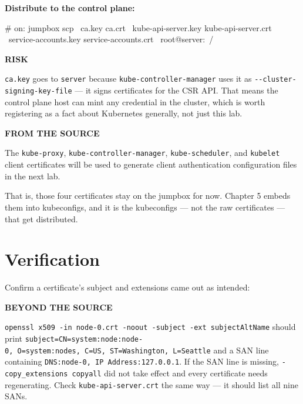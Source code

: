 \documentclass[11pt,oneside]{report}
\newcommand{\calloutlabel}[2]{{\sffamily\bfseries\footnotesize\color{#1}#2\quad}}
\begin{document}
\textbf{Distribute
to the control
plane:}

\begin{cmdlst}
# on: jumpbox
scp \
  ca.key ca.crt \
  kube-api-server.key kube-api-server.crt \
  service-accounts.key service-accounts.crt \
  root@server:~/
\end{cmdlst}

\begin{riskbox}\calloutlabel{brick}{RISK}

\texttt{ca.key} goes
to \texttt{server}
because
\texttt{kube-}\allowbreak{}\texttt{controller-}\allowbreak{}\texttt{manager}
uses it as
\texttt{-\/-cluster-}\allowbreak{}\texttt{signing-}\allowbreak{}\texttt{key-}\allowbreak{}\texttt{file}
--- it signs
certificates for the
CSR API. That means
the control plane
host can mint any
credential in the
cluster, which is
worth registering as
a fact about
Kubernetes
generally, not just
this lab.

\end{riskbox}

\begin{notebox}\calloutlabel{steel}{FROM THE SOURCE}

The
\texttt{kube-proxy},
\texttt{kube-}\allowbreak{}\texttt{controller-}\allowbreak{}\texttt{manager},
\texttt{kube-scheduler},
and \texttt{kubelet}
client certificates
will be used to
generate client
authentication
configuration files
in the next lab.

\end{notebox}

That is, those four
certificates stay on
the jumpbox for now.
Chapter 5 embeds
them into
kubeconfigs, and it
is the kubeconfigs
--- not the raw
certificates ---
that get
distributed.

\hypertarget{verification-3}{%
\section{Verification}\label{verification-3}}

Confirm a
certificate's
subject and
extensions came out
as intended:

\begin{beyondbox}\calloutlabel{teal}{BEYOND THE SOURCE}

\texttt{openssl\ x509\ -}\allowbreak{}\texttt{in\ node-}\allowbreak{}\texttt{0.}\allowbreak{}\texttt{crt\ -}\allowbreak{}\texttt{noout\ -}\allowbreak{}\texttt{subject\ -}\allowbreak{}\texttt{ext\ subjectAltName}
should print
\texttt{subject=CN=system:}\allowbreak{}\texttt{node:}\allowbreak{}\texttt{node-}\allowbreak{}\texttt{0,\ O=system:}\allowbreak{}\texttt{nodes,\ C=US,\ ST=Washington,\ L=Seattle}
and a SAN line
containing
\texttt{DNS:}\allowbreak{}\texttt{node-}\allowbreak{}\texttt{0,\ IP\ Address:}\allowbreak{}\texttt{127.}\allowbreak{}\texttt{0.}\allowbreak{}\texttt{0.}\allowbreak{}\texttt{1}.
If the SAN line is
missing,
\texttt{-}\allowbreak{}\texttt{copy\_extensions\ copyall}
did not take effect
and every
certificate needs
regenerating. Check
\texttt{kube-}\allowbreak{}\texttt{api-}\allowbreak{}\texttt{server.}\allowbreak{}\texttt{crt}
the same way --- it
should list all nine
SANs.

\end{beyondbox}
\end{document}
